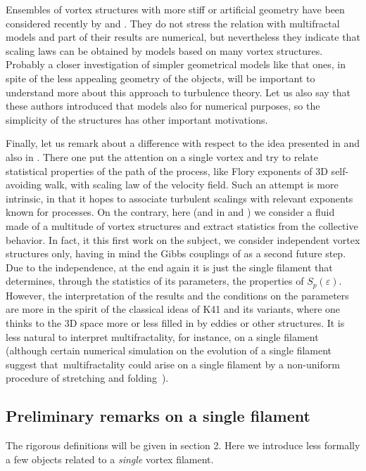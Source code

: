 \documentclass[a4paper,12pt]{article}
\begin{document}
Ensembles of vortex structures with more stiff or artificial geometry have
been considered recently by \cite{Pullin} and \cite{HKambe}. They do not
stress the relation with multifractal models and part of their results are
numerical, but nevertheless they indicate that scaling laws can be obtained by
models based on many vortex structures. Probably a closer investigation of
simpler geometrical models like that ones, in spite of the less appealing
geometry of the objects, will be important to understand more about this
approach to turbulence theory. Let us also say that these authors introduced
that models also for numerical purposes, so the simplicity of the structures
has other important motivations.

Finally, let us remark about a difference with respect to the idea presented
in \cite{Ch} and also in \cite{Boyer}. There one put the attention on a single
vortex and try to relate statistical properties of the path of the process,
like Flory exponents of 3D self-avoiding walk, with scaling law of the
velocity field. Such an attempt is more intrinsic, in that it hopes to
associate turbulent scalings with relevant exponents known for processes. On
the contrary, here (and in \cite{Pullin} and \cite{HKambe}) we consider a
fluid made of a multitude of vortex structures and extract statistics from the
collective behavior. In fact, it this first work on the subject, we consider
independent vortex structures only, having in mind the Gibbs couplings of
\cite{FG1} as a second future step. Due to the independence, at the end again
it is just the single filament that determines, through the statistics of its
parameters, the properties of $S_{p}(\varepsilon)$. However, the
interpretation of the results and the conditions on the parameters are more in
the spirit of the classical ideas of K41 and its variants, where one thinks to
the 3D space more or less filled in by eddies or other structures. It is less
natural to interpret multifractality, for instance, on a single filament
(although certain numerical simulation on the evolution of a single filament
suggest that\ multifractality could arise on a single filament by a
non-uniform procedure of stretching and folding~\cite{Barsanti}).

\subsection{Preliminary remarks on a single filament\label{introtech}}

The rigorous definitions will be given in section 2. Here we introduce less
formally a few objects related to a \textit{single} vortex filament.
\end{document}
